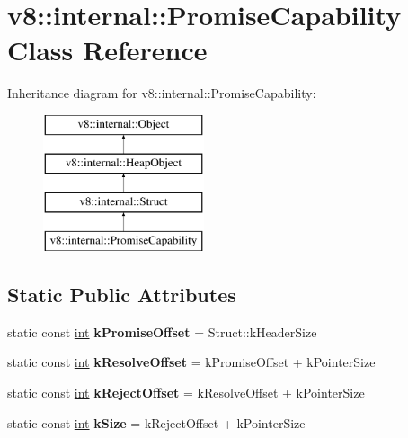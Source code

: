 \hypertarget{classv8_1_1internal_1_1PromiseCapability}{}\section{v8\+:\+:internal\+:\+:Promise\+Capability Class Reference}
\label{classv8_1_1internal_1_1PromiseCapability}
Inheritance diagram for v8\+:\+:internal\+:\+:Promise\+Capability\+:\begin{figure}[H]
\begin{center}
\leavevmode
\includegraphics[height=4.000000cm]{classv8_1_1internal_1_1PromiseCapability}
\end{center}
\end{figure}
\subsection*{Static Public Attributes}
\begin{DoxyCompactItemize}
\item 
\mbox{\label{classv8_1_1internal_1_1PromiseCapability_a3a81a74fd6695c40e3b2d45ad8b34dde}} 
static const \mbox{\hyperlink{classint}{int}} {\bfseries k\+Promise\+Offset} = Struct\+::k\+Header\+Size
\item 
\mbox{\label{classv8_1_1internal_1_1PromiseCapability_afa79092d4018c7aa0292f8313f0588d8}} 
static const \mbox{\hyperlink{classint}{int}} {\bfseries k\+Resolve\+Offset} = k\+Promise\+Offset + k\+Pointer\+Size
\item 
\mbox{\label{classv8_1_1internal_1_1PromiseCapability_ae2a863b28f9ef4910932ec0c6f2fa753}} 
static const \mbox{\hyperlink{classint}{int}} {\bfseries k\+Reject\+Offset} = k\+Resolve\+Offset + k\+Pointer\+Size
\item 
\mbox{\label{classv8_1_1internal_1_1PromiseCapability_a8ba6942bf8440f240094c9dee54da39a}} 
static const \mbox{\hyperlink{classint}{int}} {\bfseries k\+Size} = k\+Reject\+Offset + k\+Pointer\+Size
\end{DoxyCompactItemize}
